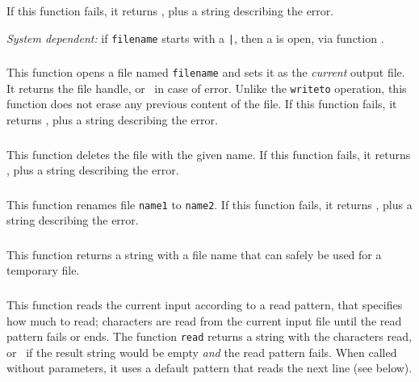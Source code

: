 If this function fails, it returns \nil,
plus a string describing the error.

{\em System dependent:} if \verb'filename' starts with a \verb'|',
then a  is open, via function .

\subsubsection*{}

This function opens a file named \verb'filename' and sets it as the
{\em current} output file.
It returns the file handle,
or \nil\ in case of error.
Unlike the \verb'writeto' operation,
this function does not erase any previous content of the file.
If this function fails, it returns \nil,
plus a string describing the error.

\subsubsection*{}

This function deletes the file with the given name.
If this function fails, it returns \nil,
plus a string describing the error.

\subsubsection*{}

This function renames file \verb'name1' to \verb'name2'.
If this function fails, it returns \nil,
plus a string describing the error.

\subsubsection*{}

This function returns a string with a file name that can safely
be used for a temporary file.

\subsubsection*{}

This function reads the current input
according to a read pattern, that specifies how much to read;
characters are read from the current input file until
the read pattern fails or ends.
The function \verb|read| returns a string with the characters read,
or \nil\ if the result string would be empty {\em and\/}
the read pattern fails.
When called without parameters,
it uses a default pattern that reads the next line
(see below).

